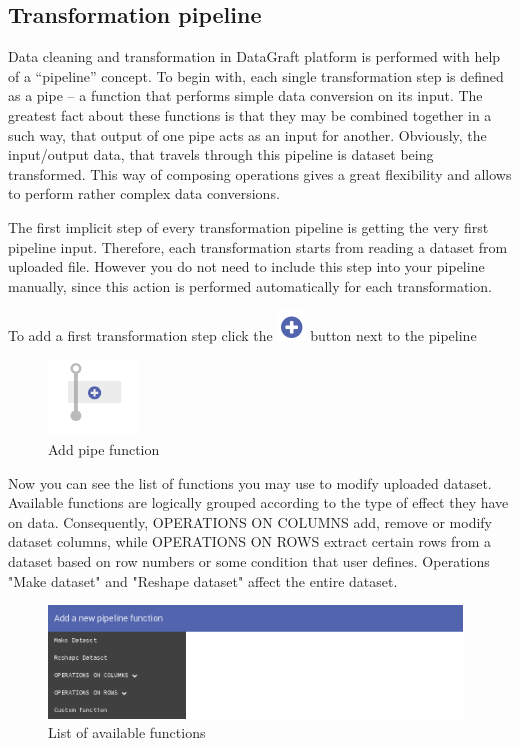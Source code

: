 \documentclass[USenglish]{article}
\begin{document}
\subsection{Transformation pipeline}
Data cleaning and transformation in DataGraft platform is performed with help of a “pipeline” concept.  To begin with, each single transformation step is defined as a pipe – a function that performs simple data conversion on its input. The greatest fact about these functions is that they may be combined together in a such way, that output of one pipe acts as an input for another. Obviously, the input/output data, that travels through this pipeline is dataset being transformed. This way of composing operations gives a great flexibility and allows to perform rather complex data conversions.

The first implicit step of every transformation pipeline is getting the very first pipeline input. Therefore, each transformation starts from reading a dataset from uploaded file. However you do not need to include this step into your pipeline manually, since this action is performed automatically for each transformation.

To add a first transformation step click the {\includegraphics[scale=0.5]{add.png}} button next to the pipeline
\begin{center}
\begin{figure}[!htbp]
\centering
\includegraphics[height=2cm] {addpipefunction.png}
 \caption{Add pipe function \label{meta}}
\end{figure}
\end{center}

Now you can see the list of functions you may use to modify uploaded dataset. Available functions are logically grouped according to the type of effect they have on data. Consequently, OPERATIONS ON COLUMNS add, remove or modify dataset columns, while OPERATIONS ON ROWS extract certain rows from a dataset based on row numbers or some condition that user defines. Operations "Make dataset" and "Reshape dataset" affect the entire dataset.
\begin{center}
\begin{figure}[!htbp]
\centering
\includegraphics[height=3cm] {functionlist.png}
 \caption{List of available functions \label{meta}}
\end{figure}
\end{center}
\end{document}

